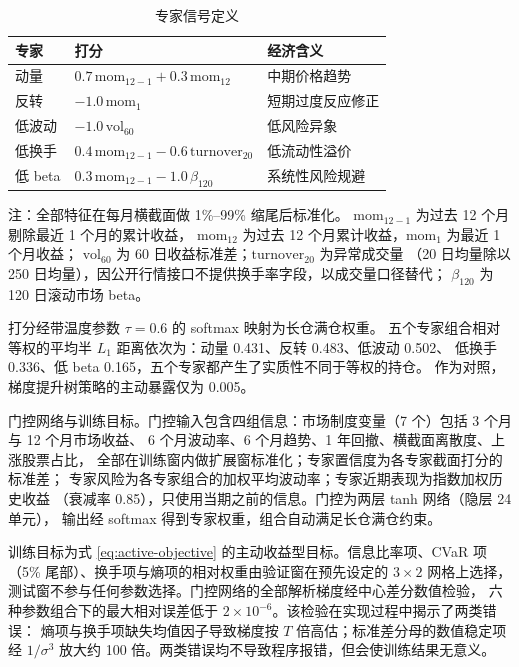 \begin{table}[htbp]
\centering
\caption{专家信号定义}
\label{tab:expert-def}
\begin{threeparttable}
\small
\begin{tabular}{lll}
\toprule
专家 & 打分 & 经济含义 \\
\midrule
动量 & $0.7\,\mathrm{mom}_{12-1}+0.3\,\mathrm{mom}_{12}$ & 中期价格趋势 \\
反转 & $-1.0\,\mathrm{mom}_{1}$ & 短期过度反应修正 \\
低波动 & $-1.0\,\mathrm{vol}_{60}$ & 低风险异象 \\
低换手 & $0.4\,\mathrm{mom}_{12-1}-0.6\,\mathrm{turnover}_{20}$ & 低流动性溢价 \\
低 beta & $0.3\,\mathrm{mom}_{12-1}-1.0\,\beta_{120}$ & 系统性风险规避 \\
\bottomrule
\end{tabular}
\begin{tablenotes}[flushleft]\footnotesize
\item 注：全部特征在每月横截面做 1\%--99\% 缩尾后标准化。
$\mathrm{mom}_{12-1}$ 为过去 12 个月剔除最近 1 个月的累计收益，
$\mathrm{mom}_{12}$ 为过去 12 个月累计收益，$\mathrm{mom}_{1}$ 为最近 1 个月收益；
$\mathrm{vol}_{60}$ 为 60 日收益标准差；$\mathrm{turnover}_{20}$ 为异常成交量
（20 日均量除以 250 日均量），因公开行情接口不提供换手率字段，以成交量口径替代；
$\beta_{120}$ 为 120 日滚动市场 beta。
\end{tablenotes}
\end{threeparttable}
\end{table}

打分经带温度参数 $\tau=0.6$ 的 softmax 映射为长仓满仓权重。
五个专家组合相对等权的平均半 $L_1$ 距离依次为：动量 0.431、反转 0.483、低波动 0.502、
低换手 0.336、低 beta 0.165，五个专家都产生了实质性不同于等权的持仓。
作为对照，梯度提升树策略的主动暴露仅为 0.005。

门控网络与训练目标。门控输入包含四组信息：市场制度变量（7 个）包括 3 个月与 12 个月市场收益、
6 个月波动率、6 个月趋势、1 年回撤、横截面离散度、上涨股票占比，
全部在训练窗内做扩展窗标准化；专家置信度为各专家截面打分的标准差；
专家风险为各专家组合的加权平均波动率；专家近期表现为指数加权历史收益
（衰减率 0.85），只使用当期之前的信息。门控为两层 tanh 网络（隐层 24 单元），
输出经 softmax 得到专家权重，组合自动满足长仓满仓约束。

训练目标为式 \eqref{eq:active-objective} 的主动收益型目标。信息比率项、CVaR 项
（5\% 尾部）、换手项与熵项的相对权重由验证窗在预先设定的 $3\times2$ 网格上选择，
测试窗不参与任何参数选择。门控网络的全部解析梯度经中心差分数值检验，
六种参数组合下的最大相对误差低于 $2\times10^{-6}$。该检验在实现过程中揭示了两类错误：
熵项与换手项缺失均值因子导致梯度按 $T$ 倍高估；标准差分母的数值稳定项经 $1/\sigma^3$
放大约 100 倍。两类错误均不导致程序报错，但会使训练结果无意义。

